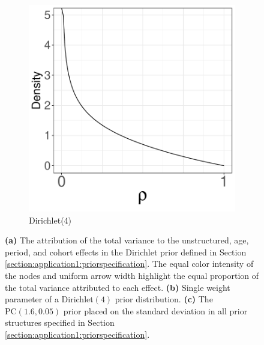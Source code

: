 \begin{figure}[h!]
\begin{subfigure}[b]{0.35\textwidth}
        \includegraphics[width=\textwidth]{Figures/prior_dir4.pdf}
        \caption[]%
        {{\small Dirichlet(4)}}    
        \label{figure:application1:dir4}
    \end{subfigure}
    \caption{\textbf{(a)} The attribution of the total variance to the unstructured, age, period, and cohort effects in the Dirichlet prior defined in Section \ref{section:application1:priorspecification}. The equal color intensity of the nodes and uniform arrow width highlight the equal proportion of the total variance attributed to each effect. \textbf{(b)} Single weight parameter of a Dirichlet$(4)$ prior distribution. \textbf{(c)} The $\text{PC}(1.6,0.05)$ prior placed on the standard deviation in all prior structures specified in Section \ref{section:application1:priorspecification}. }
    \label{fig:application1:priors}
\end{figure}

